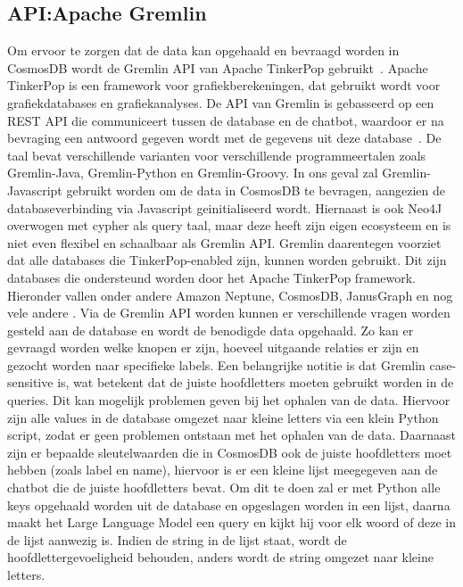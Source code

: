 \subsection{API:\@ Apache Gremlin}{\label{sec:gremlin}}
Om ervoor te zorgen dat de data kan opgehaald en bevraagd worden in CosmosDB wordt de Gremlin API van Apache TinkerPop gebruikt~\autocite{Tinkerpop2023}.
Apache TinkerPop is een framework voor grafiekberekeningen, dat gebruikt wordt voor grafiekdatabases en grafiekanalyses.
De API van Gremlin is gebasseerd op een REST API die communiceert tussen de database en de chatbot, waardoor er na bevraging een antwoord gegeven wordt met de gegevens uit deze database~\autocite{Medina2021}.
De taal bevat verschillende varianten voor verschillende programmeertalen zoals Gremlin-Java, Gremlin-Python en Gremlin-Groovy.
In ons geval zal Gremlin-Javascript gebruikt worden om de data in CosmosDB te bevragen, aangezien de databaseverbinding via Javascript geinitialiseerd wordt. 
Hiernaast is ook Neo4J overwogen met cypher als query taal, maar deze heeft zijn eigen ecosysteem en is niet even flexibel en schaalbaar als Gremlin API.\@
Gremlin daarentegen voorziet dat alle databases die TinkerPop-enabled zijn, kunnen worden gebruikt. Dit zijn databases die ondersteund worden door het Apache TinkerPop framework.
Hieronder vallen onder andere Amazon Neptune, CosmosDB, JanusGraph en nog vele andere \autocite{Tinkerpop2023a}.
Via de Gremlin API worden kunnen er verschillende vragen worden gesteld aan de database en wordt de benodigde data opgehaald. 
Zo kan er gevraagd worden welke knopen er zijn, hoeveel uitgaande relaties er zijn en gezocht worden naar specifieke labels.
Een belangrijke notitie is dat Gremlin case-sensitive is, wat betekent dat de juiste hoofdletters moeten gebruikt worden in de queries.
Dit kan mogelijk problemen geven bij het ophalen van de data. Hiervoor zijn alle values in de database omgezet naar kleine letters via een klein Python script, zodat er geen problemen ontstaan met het ophalen van de data.
Daarnaast zijn er bepaalde sleutelwaarden die in CosmosDB ook de juiste hoofdletters moet hebben (zoals label en name), hiervoor is er een kleine lijst meegegeven aan de chatbot die de juiste hoofdletters bevat.
Om dit te doen zal er met Python alle keys opgehaald worden uit de database en opgeslagen worden in een lijst, daarna maakt het Large Language Model een query en kijkt hij voor elk woord of deze in de lijst aanwezig is.
Indien de string in de lijst staat, wordt de hoofdlettergevoeligheid behouden, anders wordt de string omgezet naar kleine letters.

